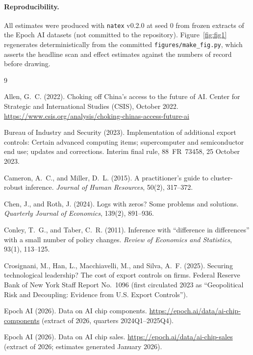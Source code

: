 \documentclass[11pt]{article}
\newcommand{\natex}{\texttt{natex}}
\begin{document}
\paragraph{Reproducibility.} All estimates were produced with \natex{}
v0.2.0 \cite{natex} at seed 0 from frozen extracts of the Epoch AI datasets
\cite{epochchipsales,epochchipcomponents} (not committed to the repository).
Figure~\ref{fig:fig1} regenerates deterministically from the committed
\texttt{figures/make\_fig.py}, which asserts the headline scan and effect
estimates against the numbers of record before drawing.

\scriptsize
\begin{thebibliography}{9}
\setlength{\itemsep}{1pt}\setlength{\parskip}{0pt}

Allen, G.~C. (2022).
Choking off China's access to the future of AI.
Center for Strategic and International Studies (CSIS), October 2022.
\url{https://www.csis.org/analysis/choking-chinas-access-future-ai}

Bureau of Industry and Security (2023).
Implementation of additional export controls: Certain advanced computing
items; supercomputer and semiconductor end use; updates and corrections.
Interim final rule, 88~FR~73458, 25 October 2023.

Cameron, A.~C., and Miller, D.~L. (2015).
A practitioner's guide to cluster-robust inference.
\emph{Journal of Human Resources}, 50(2), 317--372.

Chen, J., and Roth, J. (2024).
Logs with zeros? Some problems and solutions.
\emph{Quarterly Journal of Economics}, 139(2), 891--936.

Conley, T.~G., and Taber, C.~R. (2011).
Inference with ``difference in differences'' with a small number of policy
changes.
\emph{Review of Economics and Statistics}, 93(1), 113--125.

Crosignani, M., Han, L., Macchiavelli, M., and Silva, A.~F. (2025).
Securing technological leadership? The cost of export controls on firms.
Federal Reserve Bank of New York Staff Report No.~1096 (first circulated
2023 as ``Geopolitical Risk and Decoupling: Evidence from U.S. Export
Controls'').

Epoch AI (2026).
Data on AI chip components.
\url{https://epoch.ai/data/ai-chip-components} (extract of 2026, quarters
2024Q1--2025Q4).

Epoch AI (2026).
Data on AI chip sales.
\url{https://epoch.ai/data/ai-chip-sales} (extract of 2026; estimates
generated January 2026).


\end{thebibliography}
\end{document}

